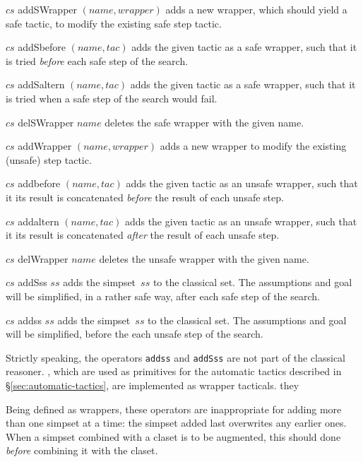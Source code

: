 \begin{ttdescription}
\item[$cs$ addSWrapper $(name,wrapper)$] 
adds a new wrapper, which should yield a safe tactic, 
to modify the existing safe step tactic.

\item[$cs$ addSbefore $(name,tac)$] 
adds the given tactic as a safe wrapper, such that it is tried 
{\em before} each safe step of the search.

\item[$cs$ addSaltern $(name,tac)$] 
adds the given tactic as a safe wrapper, such that it is tried 
when a safe step of the search would fail.

\item[$cs$ delSWrapper $name$] 
deletes the safe wrapper with the given name.

\item[$cs$ addWrapper $(name,wrapper)$] 
adds a new wrapper to modify the existing (unsafe) step tactic.

\item[$cs$ addbefore $(name,tac)$] 
adds the given tactic as an unsafe wrapper, such that it its result is 
concatenated {\em before} the result of each unsafe step.

\item[$cs$ addaltern $(name,tac)$] 
adds the given tactic as an unsafe wrapper, such that it its result is 
concatenated {\em after} the result of each unsafe step.

\item[$cs$ delWrapper $name$] 
deletes the unsafe wrapper with the given name.

\item[$cs$ addSss $ss$] 
adds the simpset~$ss$ to the classical set.  The assumptions and goal will be
simplified, in a rather safe way, after each safe step of the search.

\item[$cs$ addss $ss$] 
adds the simpset~$ss$ to the classical set.  The assumptions and goal will be
simplified, before the each unsafe step of the search.

\end{ttdescription}

Strictly speaking, the operators \texttt{addss} and \texttt{addSss}
are not part of the classical reasoner.
, which are used as primitives 
for the automatic tactics described in \S\ref{sec:automatic-tactics}, are
implemented as wrapper tacticals.
they  
\begin{warn}
Being defined as wrappers, these operators are inappropriate for adding more 
than one simpset at a time: the simpset added last overwrites any earlier ones.
When a simpset combined with a claset is to be augmented, this should done 
{\em before} combining it with the claset.
\end{warn}


